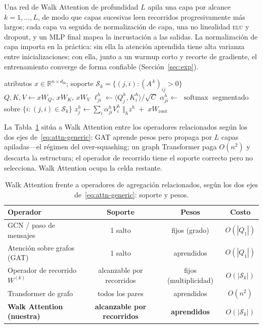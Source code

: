 \documentclass[runningheads]{llncs}
\newcommand{\RR}{\mathbb{R}}
\newcommand{\Adj}{A}
\DeclareMathOperator{\softmax}{softmax}
\begin{document}
Una red de Walk Attention de profundidad $L$ apila una capa por alcance
$k=1,\dots,L$, de modo que capas sucesivas leen recorridos progresivamente más
largos; cada capa va seguida de normalización de capa, una no linealidad
\textsc{elu} y dropout, y un MLP final mapea la incrustación a las salidas. La
normalización de capa importa en la práctica: sin ella la atención aprendida
tiene alta varianza entre inicializaciones; con ella, junto a un warmup corto y
recorte de gradiente, el entrenamiento converge de forma confiable
(Sección~\ref{sec:exp}).

\begin{algorithm}[t]
\caption{Capa de Walk Attention a alcance $k$ (dispersa).}\label{alg:wa}
\begin{algorithmic}[1]
\Require atributos $x\in\RR^{n\times d_{\text{in}}}$; soporte
  $\mathcal{S}_k=\{(j,i):(\Adj^{\,k})_{ij}>0\}$
\State $Q,K,V \gets xW_Q,\,xW_K,\,xW_V$ 
  \State $\ell^h_{ji}\gets \langle Q^h_j,K^h_i\rangle/\sqrt{C}$
\EndFor
\State $\alpha^h_{ji}\gets$ $\softmax$ segmentado sobre $\{i:(j,i)\in\mathcal{S}_k\}$
\State $z^h_j\gets \sum_i \alpha^h_{ji}V^h_i$ 
\State \Return $\bigl\Vert_h z^h \;+\; xW_{\!\text{root}}$
\end{algorithmic}
\end{algorithm}

La Tabla~\ref{tab:relation} sitúa a Walk Attention entre los operadores
relacionados según los dos ejes de~\eqref{eq:attn-generic}: GAT aprende pesos
pero propaga por $L$ capas apiladas---el régimen del over-squashing; un graph
Transformer paga $O(n^2)$ y descarta la estructura; el operador de recorrido
tiene el soporte correcto pero no selecciona. Walk Attention ocupa la celda
restante.

\begin{table}[t]
\centering
\caption{Walk Attention frente a operadores de agregación relacionados, según
los dos ejes de~\eqref{eq:attn-generic}: soporte y pesos.}
\label{tab:relation}
\begin{tabular}{lccc}
\toprule
\textbf{Operador} & \textbf{Soporte} & \textbf{Pesos} & \textbf{Costo} \\
\midrule
GCN / paso de mensajes       & 1 salto      & fijos (grado) & $O(|Q_1|)$ \\
Atención sobre grafos (GAT)  & 1 salto      & aprendidos    & $O(|Q_1|)$ \\
Operador de recorrido $W^{(k)}$ & alcanzable por recorridos & fijos (multiplicidad) & $O(|\mathcal{S}_k|)$ \\
Transformer de grafo         & todos los pares & aprendidos & $O(n^2)$ \\
\textbf{Walk Attention (nuestra)} & \textbf{alcanzable por recorridos} & \textbf{aprendidos} & $O(|\mathcal{S}_k|)$ \\
\bottomrule
\end{tabular}
\end{table}
\end{document}
